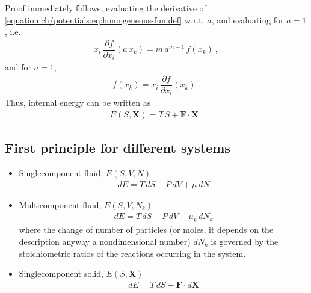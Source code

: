\documentclass[letterpaper,10pt,english]{jupyterBook}
\begin{document}
\sphinxAtStartPar
Proof immediately follows, evaluating the derivative of \eqref{equation:ch/potentials:eq:homogeneous-fun:def} w.r.t. \(a\), and evaluating for \(a = 1\), i.e.
\begin{equation*}
\begin{split}x_i \, \dfrac{\partial f}{\partial x_i} (a \, x_k) = m \, a^{m-1} \, f(x_k) \ ,\end{split}
\end{equation*}
\sphinxAtStartPar
and for \(a = 1\),
\begin{equation*}
\begin{split}f(x_k) = x_i \, \dfrac{\partial f}{\partial x_i} (x_k)\ .\end{split}
\end{equation*}
\sphinxAtStartPar
Thus, internal energy can be written as
\begin{equation*}
\begin{split}E(S, \mathbf{X}) = T \, S + \mathbf{F} \cdot \mathbf{X} \ .\end{split}
\end{equation*}

\subsection{First principle for different systems}
\label{\detokenize{ch/potentials:first-principle-for-different-systems}}\begin{itemize}
\item {} 
\sphinxAtStartPar
Single\sphinxhyphen{}component fluid, \(E(S, V, N)\)
\begin{equation*}
\begin{split}d E = T \, d S - P \, d V + \mu \, d N\end{split}
\end{equation*}
\item {} 
\sphinxAtStartPar
Multi\sphinxhyphen{}component fluid, \(E(S, V, N_k)\)
\begin{equation*}
\begin{split}d E = T \, dS - P \, d V + \mu_k \, d N_k\end{split}
\end{equation*}
\sphinxAtStartPar
where the change of number of particles (or moles, it depends on the description \sphinxhyphen{} anyway a non\sphinxhyphen{}dimensional number) \(d N_k\) is governed by the stoichiometric ratios of the reactions occurring in the system.

\item {} 
\sphinxAtStartPar
Single\sphinxhyphen{}component solid, \(E(S, \mathbf{X})\)
\begin{equation*}
\begin{split}d E = T \, dS + \mathbf{F} \cdot d \mathbf{X}\end{split}
\end{equation*}
\end{itemize}
\end{document}

